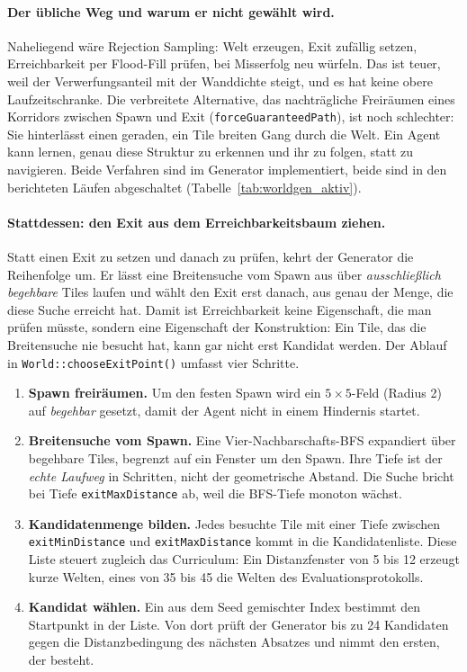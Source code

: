 \documentclass[11pt,a4paper]{article}
\begin{document}
\paragraph{Der übliche Weg und warum er nicht gewählt wird.} Naheliegend wäre
Rejection Sampling: Welt erzeugen, Exit zufällig setzen, Erreichbarkeit per
Flood-Fill prüfen, bei Misserfolg neu würfeln. Das ist teuer, weil der
Verwerfungsanteil mit der Wanddichte steigt, und es hat keine obere
Laufzeitschranke. Die verbreitete Alternative, das nachträgliche Freiräumen
eines Korridors zwischen Spawn und Exit (\texttt{forceGuaranteedPath}), ist
noch schlechter: Sie hinterlässt einen geraden, ein Tile breiten Gang durch die
Welt. Ein Agent kann lernen, genau diese Struktur zu erkennen und ihr zu
folgen, statt zu navigieren. Beide Verfahren sind im Generator implementiert,
beide sind in den berichteten Läufen abgeschaltet
(Tabelle~\ref{tab:worldgen_aktiv}).

\paragraph{Stattdessen: den Exit aus dem Erreichbarkeitsbaum ziehen.} Statt
einen Exit zu setzen und danach zu prüfen, kehrt der Generator die Reihenfolge
um. Er lässt eine Breitensuche vom Spawn aus über \emph{ausschließlich
begehbare} Tiles laufen und wählt den Exit erst danach, aus genau der Menge,
die diese Suche erreicht hat. Damit ist Erreichbarkeit keine Eigenschaft, die
man prüfen müsste, sondern eine Eigenschaft der Konstruktion: Ein Tile, das die
Breitensuche nie besucht hat, kann gar nicht erst Kandidat werden. Der Ablauf
in \texttt{World::chooseExitPoint()} umfasst vier Schritte.

\begin{enumerate}
  \item \textbf{Spawn freiräumen.} Um den festen Spawn wird ein $5\times5$-Feld
    (Radius 2) auf \emph{begehbar} gesetzt, damit der Agent nicht in einem
    Hindernis startet.
  \item \textbf{Breitensuche vom Spawn.} Eine Vier-Nachbarschafts-BFS
    expandiert über begehbare Tiles, begrenzt auf ein Fenster um den Spawn.
    Ihre Tiefe ist der \emph{echte Laufweg} in Schritten, nicht der
    geometrische Abstand. Die Suche bricht bei Tiefe
    \texttt{exitMaxDistance} ab, weil die BFS-Tiefe monoton wächst.
  \item \textbf{Kandidatenmenge bilden.} Jedes besuchte Tile mit einer Tiefe
    zwischen \texttt{exitMinDistance} und \texttt{exitMaxDistance} kommt in die
    Kandidatenliste. Diese Liste steuert zugleich das Curriculum: Ein
    Distanzfenster von 5 bis 12 erzeugt kurze Welten, eines von 35 bis 45 die
    Welten des Evaluationsprotokolls.
  \item \textbf{Kandidat wählen.} Ein aus dem Seed gemischter Index bestimmt den
    Startpunkt in der Liste. Von dort prüft der Generator bis zu 24 Kandidaten
    gegen die Distanzbedingung des nächsten Absatzes und nimmt den ersten, der
    besteht.
\end{enumerate}
\end{document}
